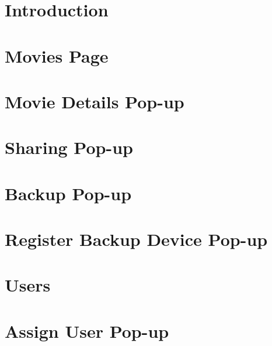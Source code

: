 \documentclass{report}
\begin{document}
\maketitle
{}
\tableofcontents

\clearpage
{}
\chapter{Introduction}


\chapter{Movies Page}


%

\chapter{Movie Details Pop-up\label{chapter:moviedetails}}


\chapter{Sharing Pop-up\label{chapter:sharing}}


\chapter{Backup Pop-up\label{chapter:backup}}


\chapter{Register Backup Device Pop-up\label{chapter:registerbackupdevice}}


\chapter{Users}


\chapter{Assign User Pop-up}


\appendix

\end{document}
